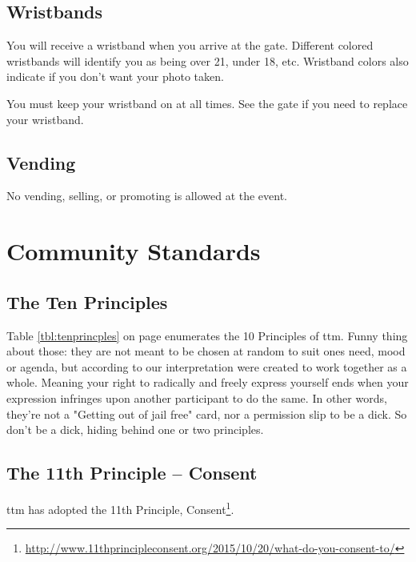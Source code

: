 \subsection*{Wristbands}
\label{sub:wristbands}
You will receive a wristband when you arrive at the \gls{gate}.  Different colored wristbands will identify you as being over 21, under 18, etc.  Wristband colors also indicate if you don't want your photo taken.  

You must keep your wristband on at all times.  See the \gls{gate} if you need to replace your wristband.

\subsection*{Vending}
No vending, selling, or promoting is allowed at the event.


\section*{Community Standards}

\subsection*{The Ten Principles}\label{tenprinciples}
Table \ref{tbl:tenprincples} on page \pageref{tbl:tenprincples} enumerates the 10 Principles of \gls{ttm}.
Funny thing about those: they are not meant to be chosen at random to suit ones need, mood or agenda, but according to our interpretation were created to work together as a whole.  
Meaning your right to radically and freely express yourself ends when your expression infringes upon another participant to do the same. 
In other words, they're not a "Getting out of jail free" card, nor a permission slip to be a dick. So don't be a dick, hiding behind one or two principles. 


\ifisflight

\else

\fi


\subsection*{The 11th Principle -- Consent}

\gls{ttm} has adopted the 11th Principle, Consent\footnote{\url{http://www.11thprincipleconsent.org/2015/10/20/what-do-you-consent-to/}}.

